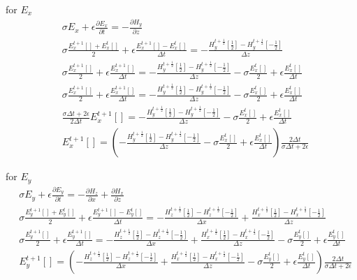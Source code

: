 for $E_{x}$
\begin{equation}
\begin{split}
&\sigma  E_{x} + \epsilon \frac{\partial  E_{x}}{\partial t} =-\frac{\partial  H_{y}}{\partial z}\\
&\sigma  \frac{E_{x}^{t+1}[]+E_{x}^{t}[]}{2} + \epsilon \frac{E_{x}^{t+1}[]-E_{x}^{t}[]}{\Delta t} = -\frac{H_{y}^{t+\frac{1}{2}}[\frac{1}{2}]-H_{y}^{t+\frac{1}{2}}[-\frac{1}{2}]}{\Delta z}\\
&\sigma  \frac{E_{x}^{t+1}[]}{2} + \epsilon \frac{E_{x}^{t+1}[]}{\Delta t} = -\frac{H_{y}^{t+\frac{1}{2}}[\frac{1}{2}]-H_{y}^{t+\frac{1}{2}}[-\frac{1}{2}]}{\Delta z}-\sigma  \frac{E_{x}^{t}[]}{2}+\epsilon \frac{E_{x}^{t}[]}{\Delta t}\\
&\sigma  \frac{E_{x}^{t+1}[]}{2} + \epsilon \frac{E_{x}^{t+1}[]}{\Delta t} = -\frac{H_{y}^{t+\frac{1}{2}}[\frac{1}{2}]-H_{y}^{t+\frac{1}{2}}[-\frac{1}{2}]}{\Delta z}-\sigma  \frac{E_{x}^{t}[]}{2}+\epsilon \frac{E_{x}^{t}[]}{\Delta t}\\
& \frac{\sigma \Delta t  + 2 \epsilon  }{ 2 \Delta t}E_{x}^{t+1}[] = -\frac{H_{y}^{t+\frac{1}{2}}[\frac{1}{2}]-H_{y}^{t+\frac{1}{2}}[-\frac{1}{2}]}{\Delta z}-\sigma  \frac{E_{x}^{t}[]}{2}+\epsilon \frac{E_{x}^{t}[]}{\Delta t}\\
& E_{x}^{t+1}[] = \left ( -\frac{H_{y}^{t+\frac{1}{2}}[\frac{1}{2}]-H_{y}^{t+\frac{1}{2}}[-\frac{1}{2}]}{\Delta z}-\sigma  \frac{E_{x}^{t}[]}{2}+\epsilon \frac{E_{x}^{t}[]}{\Delta t} \right ) \frac{2 \Delta t}{\sigma \Delta t  + 2 \epsilon}
\end{split}
\end{equation}

for $E_{y}$
\begin{equation}
\begin{split}
&\sigma  E_{y} + \epsilon \frac{\partial  E_{y}}{\partial t} = -\frac{\partial  H_{z}}{\partial x}+\frac{\partial  H_{x}}{\partial z}\\
&\sigma  \frac{E_{y}^{t+1}[]+E_{y}^{t}[]}{2} + \epsilon \frac{E_{y}^{t+1}[]-E_{y}^{t}[]}{\Delta t} = -\frac{H_{z}^{t+\frac{1}{2}}[\frac{1}{2}]-H_{z}^{t+\frac{1}{2}}[-\frac{1}{2}]}{\Delta x}+\frac{H_{x}^{t+\frac{1}{2}}[\frac{1}{2}]-H_{x}^{t+\frac{1}{2}}[-\frac{1}{2}]}{\Delta z}\\
&\sigma  \frac{E_{y}^{t+1}[]}{2} + \epsilon \frac{E_{y}^{t+1}[]}{\Delta t} = -\frac{H_{z}^{t+\frac{1}{2}}[\frac{1}{2}]-H_{z}^{t+\frac{1}{2}}[-\frac{1}{2}]}{\Delta x}+\frac{H_{x}^{t+\frac{1}{2}}[\frac{1}{2}]-H_{x}^{t+\frac{1}{2}}[-\frac{1}{2}]}{\Delta z}-\sigma \frac{E_{y}^{t}[]}{2} + \epsilon \frac{E_{y}^{t}[]}{\Delta t}\\
&E_{y}^{t+1}[] = \left ( -\frac{H_{z}^{t+\frac{1}{2}}[\frac{1}{2}]-H_{z}^{t+\frac{1}{2}}[-\frac{1}{2}]}{\Delta x}+\frac{H_{x}^{t+\frac{1}{2}}[\frac{1}{2}]-H_{x}^{t+\frac{1}{2}}[-\frac{1}{2}]}{\Delta z}-\sigma \frac{E_{y}^{t}[]}{2} + \epsilon \frac{E_{y}^{t}[]}{\Delta t} \right ) \frac{2 \Delta t}{\sigma \Delta t  + 2 \epsilon}
\end{split}
\end{equation}

